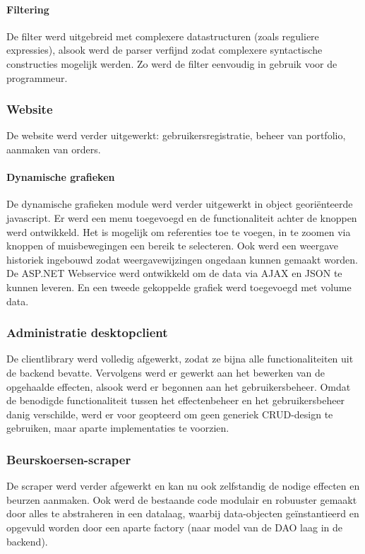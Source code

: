 \paragraph{Filtering}
De filter werd uitgebreid met complexere datastructuren (zoals reguliere expressies), alsook werd de parser verfijnd zodat complexere syntactische constructies mogelijk werden. Zo werd de filter eenvoudig in gebruik voor de programmeur.

\subsubsection{Website}
De website werd verder uitgewerkt: gebruikersregistratie, beheer van portfolio, aanmaken van orders.

\paragraph{Dynamische grafieken}
De dynamische grafieken module werd verder uitgewerkt in object geori\"enteerde javascript. Er werd een menu toegevoegd en de functionaliteit achter de knoppen werd ontwikkeld. Het is mogelijk om referenties toe te voegen, in te zoomen via knoppen of muisbewegingen een bereik te selecteren.
Ook werd een weergave historiek ingebouwd zodat weergavewijzingen ongedaan kunnen gemaakt worden. De ASP.NET Webservice werd ontwikkeld om de data via AJAX en JSON te kunnen leveren. En een tweede gekoppelde grafiek werd toegevoegd met volume data.

\subsubsection{Administratie desktopclient}
De clientlibrary werd volledig afgewerkt, zodat ze bijna alle functionaliteiten uit de backend bevatte.
Vervolgens werd er gewerkt aan het bewerken van de opgehaalde effecten, alsook werd er begonnen aan het gebruikersbeheer. Omdat de benodigde functionaliteit tussen het effectenbeheer en het gebruikersbeheer danig verschilde, werd er voor geopteerd om geen generiek CRUD-design te gebruiken, maar aparte implementaties te voorzien.

\subsubsection{Beurskoersen-scraper}
De scraper werd verder afgewerkt en kan nu ook zelfstandig de nodige effecten en beurzen aanmaken. Ook werd de bestaande code modulair en robuuster gemaakt door alles te abstraheren in een datalaag, waarbij data-objecten ge\"instantieerd en opgevuld worden door een aparte factory (naar model van de DAO laag in de backend).

